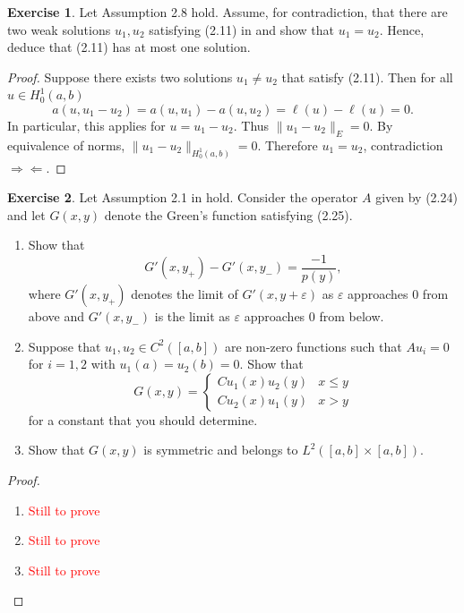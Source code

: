 \documentclass{amsart}
\theoremstyle{plain}
\theoremstyle{definition}
\newtheorem{exer}{Exercise}[section]
\newcommand{\tcr}[1]{\textcolor{red}{#1}}
\begin{document}
\begin{exer}
    Let Assumption 2.8 hold. Assume, for contradiction, that there are two weak solutions $u_1,u_2$ satisfying (2.11) in \cite{lord2014introduction} and show that $u_1 = u_2$. Hence, deduce that (2.11) has at most one solution.
\end{exer}
\begin{proof}
Suppose there exists two solutions $u_1 \neq u_2$ that satisfy (2.11). Then for all $u\in H_0^1(a,b)$
$$a(u,u_1-u_2) = a(u,u_1)-a(u,u_2) = \ell(u)-\ell(u) = 0.$$ 
In particular, this applies for $u = u_1-u_2.$ Thus $\|u_1-u_2\|_{E} = 0.$ By equivalence of norms, $\|u_1-u_2\|_{H_0^1(a,b)} = 0.$ Therefore $u_1 = u_2$, contradiction $\Rightarrow\!\Leftarrow$. 
    
\end{proof}

\begin{exer}
    Let Assumption 2.1 in \cite{lord2014introduction} hold. Consider the operator $A$ given by (2.24) and let $G(x,y)$ denote the Green's function satisfying (2.25).
    \begin{enumerate}[label=\alph*.]
        \item Show that 
        $$G'(x,y_{+}) - G'(x,y_{-}) = \frac{-1}{p(y)},$$
        where $G'(x,y_{+})$ denotes the limit of $G'(x,y+\varepsilon)$ as $\varepsilon$ approaches $0$ from above and $G'(x,y_{-})$ is the limit as $\varepsilon$ approaches $0$ from below. 
        \item Suppose that $u_1,u_2 \in C^{2}([a,b])$ are non-zero functions such that $Au_i = 0$ for $i=1,2$ with $u_1(a)=u_2(b) = 0.$ Show that 
        $$G(x,y) = \begin{cases}
            Cu_1(x)u_2(y) & x\leq y\\
            Cu_2(x)u_1(y) & x>y
    \end{cases}$$
    for a constant that you should determine.
    \item Show that $G(x,y)$ is symmetric and belongs to $L^2\left([a,b]\times[a,b]\right).$
    \end{enumerate}
\end{exer}
\begin{proof}
    \begin{enumerate}[label=\alph*.]
        \item \tcr{Still to prove}
        \item \tcr{Still to prove}
        \item \tcr{Still to prove}
    \end{enumerate}
\end{proof}
\end{document}
